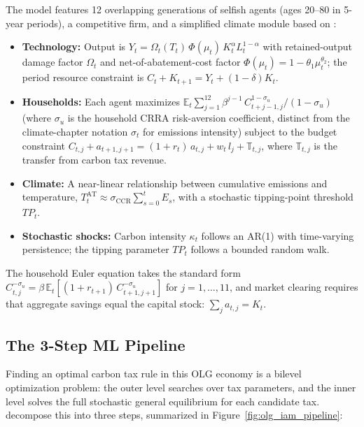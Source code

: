 \documentclass[11pt,a4paper]{report}
\begin{document}
The model features 12 overlapping generations of selfish agents (ages 20--80 in 5-year periods), a competitive firm, and a simplified climate module based on \citet{dietz2019cumulative}:
\begin{itemize}[itemsep=2pt]
\item \textbf{Technology:} Output is $Y_t = \Omega_t(T_t)\,\Phi(\mu_t)\,K_t^\alpha L_t^{1-\alpha}$ with retained-output damage factor $\Omega_t$ and net-of-abatement-cost factor $\Phi(\mu_t) = 1 - \theta_1\mu_t^{\theta_2}$; the period resource constraint is $C_t + K_{t+1} = Y_t + (1-\delta)K_t$.
\item \textbf{Households:} Each agent maximizes $\mathbb{E}_t\sum_{j=1}^{12}\beta^{j-1}\, C_{t+j-1,j}^{1-\sigma_u}/(1-\sigma_u)$ (where $\sigma_u$ is the household CRRA risk-aversion coefficient, distinct from the climate-chapter notation $\sigma_t$ for emissions intensity) subject to the budget constraint $C_{t,j} + a_{t+1,j+1} = (1+r_t)\,a_{t,j} + w_t\,l_j + \mathbb{T}_{t,j}$, where $\mathbb{T}_{t,j}$ is the transfer from carbon tax revenue.
\item \textbf{Climate:} A near-linear relationship between cumulative emissions and temperature, $T^{\mathrm{AT}}_t \approx \sigma_{\mathrm{CCR}}\sum_{s=0}^t E_s$, with a stochastic tipping-point threshold $TP_t$.
\item \textbf{Stochastic shocks:} Carbon intensity $\kappa_t$ follows an AR(1) with time-varying persistence; the tipping parameter $TP_t$ follows a bounded random walk.
\end{itemize}
The household Euler equation takes the standard form $C_{t,j}^{-\sigma_u} = \beta\,\mathbb{E}_t[(1+r_{t+1})\,C_{t+1,j+1}^{-\sigma_u}]$ for $j = 1,\ldots,11$, and market clearing requires that aggregate savings equal the capital stock: $\sum_j a_{t,j} = K_t$.

\subsection{The 3-Step ML Pipeline}

Finding an optimal carbon tax rule in this OLG economy is a bilevel optimization problem: the outer level searches over tax parameters, and the inner level solves the full stochastic general equilibrium for each candidate tax.  \citet{kubler2025using} decompose this into three steps, summarized in Figure~\ref{fig:olg_iam_pipeline}:
\end{document}
